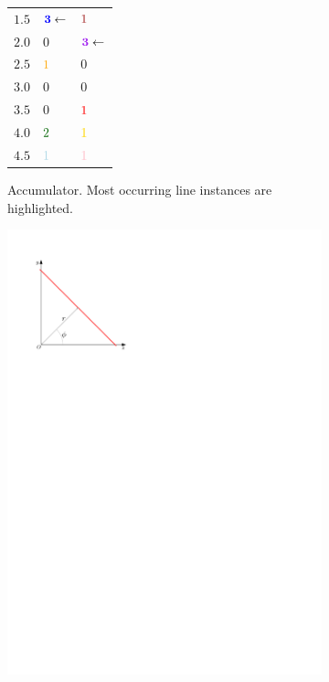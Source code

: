\begin{figure}[htb]
\begin{subfigure}[b]{0.3\linewidth}
\begin{minipage}[c]{0.45\textwidth}
\begin{tabular}{r|ll}
				$1.5$ & $\mathbf{\color[rgb]{0,0,1}{3}}\leftarrow$ & $\color[rgb]{0.647,0.165,0.165}{1}$\\
				$2.0$ & $0$ & $\mathbf{\color[rgb]{0.627,0.125,0.941}{3}}\leftarrow$\\
				$2.5$ & $\color[rgb]{1,0.647,0}{1}$ & $0$\\
				$3.0$ & $0$ & $0$\\
				$3.5$ & $0$ & $\color[rgb]{1,0,0}{1}$\\
				$4.0$ & $\color[rgb]{0,0.392,0}{2}$ & $\color[rgb]{1,0.843,0}{1}$\\
				$4.5$ & $\color[rgb]{0.678,0.847,0.902}{1}$ & $\color[rgb]{1,0.753,0.796}{1}$\\
			\end{tabular}
			\hspace{1cm}
		\end{minipage}
		\caption{Accumulator. Most occurring line instances are highlighted.}\label{fig:hough-transform:d}
	\end{subfigure}
	\quad
	\begin{subfigure}[b]{0.3\linewidth}
		\centering
		\includegraphics[width=\textwidth,page=4]{figs/hough-transform.pdf}

\end{subfigure}
\end{figure}
